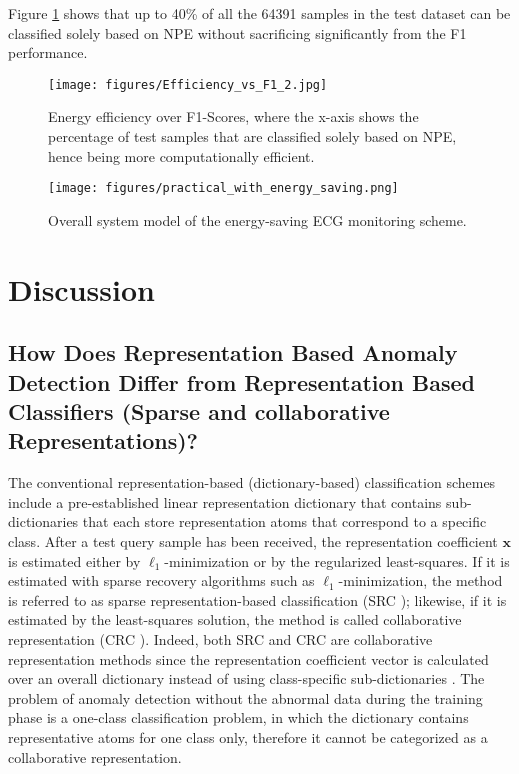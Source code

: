 \documentclass[journal,transmag]{IEEEtran}
\begin{document}
Figure \ref{fig:Efficiency_vs_F1} shows that up to 40\% of all the 64391 samples in the test dataset can be classified solely based on NPE without sacrificing significantly from the F1 performance.




\begin{figure}[!htbp]
    \captionsetup{font=footnotesize}
    \centering
    \texttt{[image: figures/Efficiency\_vs\_F1\_2.jpg]}
    \caption{Energy efficiency over F1-Scores, where the x-axis shows the percentage of test samples that are classified solely based on NPE, hence being more computationally efficient.}
    \label{fig:Efficiency_vs_F1}
\end{figure}

\begin{figure}[!htbp]
    \captionsetup{font=footnotesize}
    \centering
    \texttt{[image: figures/practical\_with\_energy\_saving.png]}
    \caption{Overall system model of the energy-saving ECG monitoring scheme.}
    \label{fig:practical_energy_saving}
\end{figure}


\section{Discussion}
\label{sec:discussion}
\subsection{How Does Representation Based Anomaly Detection Differ from Representation Based Classifiers (Sparse and collaborative Representations)?}
The conventional representation-based (dictionary-based) classification schemes include a pre-established linear representation dictionary that contains sub-dictionaries that each store representation atoms that correspond to a specific class. 
After a test query sample has been received, the representation coefficient $\bm{x}$ is estimated either by $\ell_1$-minimization or by the regularized least-squares. If it is estimated with sparse recovery algorithms such as $\ell_1$-minimization, the method is referred to as sparse representation-based classification (SRC \cite{SRC1} ); likewise, if it is estimated by the least-squares solution, the method is called collaborative representation (CRC \cite{collaborative}). 
Indeed, both SRC and CRC are collaborative representation methods since the representation coefficient vector is calculated over an overall dictionary instead of using class-specific sub-dictionaries \cite{collaborative}. The problem of anomaly detection without the abnormal data during the training phase is a one-class classification problem, in which the dictionary contains representative atoms for one class only, therefore it cannot be categorized as a collaborative representation.
\end{document}

